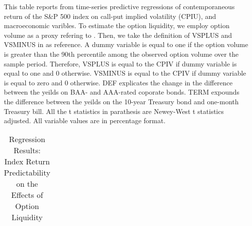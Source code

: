\begin{table}[h]

\caption{Regression Results: Index Return Predictability on the Effects of Option Liquidity}\label{table:Volume}
\begin{threeparttable}

\medskip
\begin{spacing}{1.1}
{\scriptsize  
This table reports from time-series predictive regressions of contemporaneous return of the S\&P 500 index on call-put implied volatility (CPIU), and macroeconomic varibles. To estimate the option liquidity, we employ option volume as a proxy refering to \textcite{chang2018implied}. Then, we take the definition of VSPLUS and VSMINUS in \textcite{atilgan2015implied} as reference. A dummy variable is equal to one if the option volume is greater than the 90th percentile among the observed option volume over the sample period. Therefore, VSPLUS is equal to the CPIV if dummy variable is equal to one and 0 otherwise. VSMINUS is equal to the CPIV if dummy variable is equal to zero and 0 otherwise. DEF explicates the change in the difference between the yeilds on BAA- and AAA-rated coporate bonds. TERM expounds the difference between the yeilds on the 10-year Treasury bond and one-month Treasury bill. All the t statistics in parathesis are Newey-West t statistics adjusted. All variable values are in percentage format. 
}
\end{spacing}
\medskip
\tiny
\centering
\begin{tabular}{ccccccccccccccc}
\toprule


\end{tabular}
\end{threeparttable}
\end{table}
